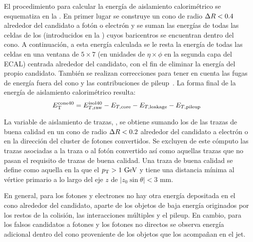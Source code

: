 El procedimiento para calcular la energía de aislamiento calorimétrico \etconefo se esquematiza en la \Fig{\ref{fig:objects:egamma:iso:iso_diagram}}. En primer lugar se construye un cono de radio \(\Delta R<0.4\) alrededor del candidato a fotón o electrón y se suman las energías de todas las celdas de los \topos (introducidos en la \Sect{\ref{subsec:objects:egamma:reco}}) cuyos baricentros se encuentran dentro del cono. A continuación, a esta energía calculada se le resta la energía de todas las celdas en una ventana de \(5\times 7\) (en unidades de \(\eta \times \phi\) en la segunda capa del \ac{ECAL}) centrada alrededor del candidato, con el fin de eliminar la energía del propio candidato.
También se realizan correcciones para tener en cuenta las fugas de energía fuera del cono y las contribuciones de pileup~\cite{PileupSubstraction}. La forma final de la energía de aislamiento calorimétrico resulta:
\begin{equation*}
    E_{\text{T}}^{\text{cone40}}  = E_{T,\text{raw}}^{\text{isol}40} - E_{T,\text{core}} - E_{T,\text{leakage}} - E_{T,\text{pileup}}
\end{equation*}


La variable de aislamiento de trazas, \ptconetw, se obtiene sumando los \pt de las trazas de buena calidad en un cono de radio \(\Delta R<0.2\) alrededor del candidato a electrón o en la dirección del cluster de fotones convertidos.
Se excluyen de este cómputo las trazas asociadas a la traza o al fotón convertido así como aquellas trazas que no pasan el requisito de trazas de buena calidad. Una traza de buena calidad se define como aquella en la que el \(p_{\text{T}}>1~\text{GeV}\) y tiene una distancia mínima al vértice primario a lo largo del eje \(z\) de \(|z_0 \sin \theta| < 3\) mm.

En general, para los fotones y electrones no hay otra energía depositada en el cono alrededor del candidato, aparte de los objetos de baja energía originados por los restos de la colisión, las interacciones múltiples y el pileup. En cambio, para los falsos candidatos a fotones y los fotones no directos se observa energía adicional dentro del cono proveniente de los objetos que los acompañan en el jet.

